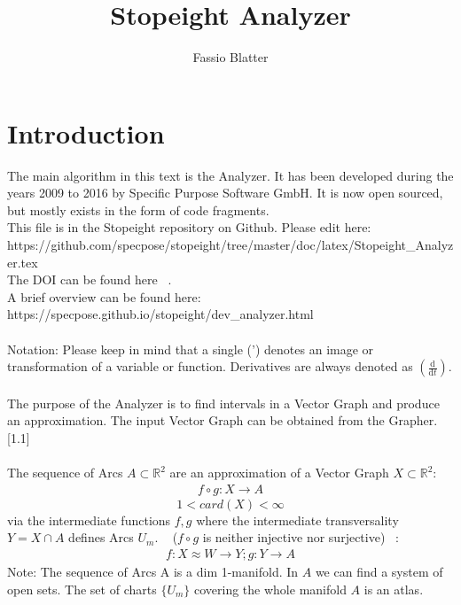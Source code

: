 \documentclass{report}
\begin{document}
\title{Stopeight Analyzer}
\author{Fassio Blatter}
\maketitle

\chapter{Introduction}
The main algorithm in this text is the Analyzer. It has been developed during the years 2009 to 2016 by Specific Purpose Software GmbH. It is now open sourced, but mostly exists in the form of code fragments.\\
This file is in the Stopeight repository on Github. Please edit here:\\
https://github.com/specpose/stopeight/tree/master/doc/latex/Stopeight\_Analyzer.tex\\
The DOI can be found here ~\cite{Stopeight}.\\
A brief overview can be found here:\\
https://specpose.github.io/stopeight/dev\_analyzer.html\\\\
Notation: Please keep in mind that a single (') denotes an image or transformation of a variable or function. Derivatives are always denoted as $(\frac{\mathrm{d}}{\mathrm{d}t})$.\\\\
The purpose of the Analyzer is to find intervals in a Vector Graph and produce an approximation. The input Vector Graph can be obtained from the Grapher. \cite{Grapher}[1.1]\\\\
The sequence of Arcs $A \subset \mathbb{R}^2$ are an approximation of a Vector Graph $X \subset \mathbb{R}^2$:
\begin{align}
f \circ g: X \rightarrow A
\end{align}
\begin{equation*}
1 < card(X) < \infty
\end{equation*}
via the intermediate functions $f,g$ where the intermediate transversality $Y = X \cap A$ defines Arcs $U_{m}$. ~\cite[9.9]{Loring} ($f \circ g$ is neither injective nor surjective) ~\cite[2.1]{LauresSzymik}:
\begin{align}
f: X \approx W \rightarrow Y; g: Y \rightarrow A
\end{align}
Note: The sequence of Arcs A is a dim 1-manifold. In $A$ we can find a system of open sets. The set of charts $\{U_{m}\}$ covering the whole manifold $A$ is an atlas. ~\cite[3.1.1.]{Fomenko} ~\cite[4.5]{Wall}
\end{document}
